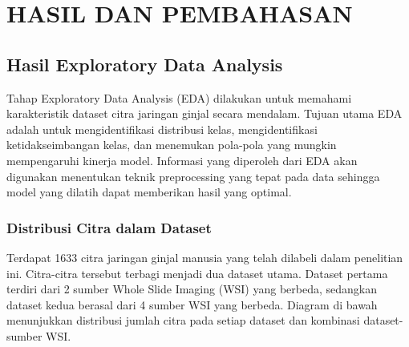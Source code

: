\chapter{HASIL DAN PEMBAHASAN}

\section{Hasil Exploratory Data Analysis}
\label{sec:hasil-eda}

\noindent Tahap Exploratory Data Analysis (EDA) dilakukan untuk memahami karakteristik dataset citra jaringan ginjal secara mendalam. Tujuan utama EDA adalah untuk mengidentifikasi distribusi kelas, mengidentifikasi ketidakseimbangan kelas, dan menemukan pola-pola yang mungkin mempengaruhi kinerja model. Informasi yang diperoleh dari EDA akan digunakan menentukan teknik preprocessing yang tepat pada data sehingga model yang dilatih dapat memberikan hasil yang optimal.

\subsection{Distribusi Citra dalam Dataset}
\noindent Terdapat 1633 citra jaringan ginjal manusia yang telah dilabeli dalam penelitian ini. Citra-citra tersebut terbagi menjadi dua dataset utama. Dataset pertama terdiri dari 2 sumber Whole Slide Imaging (WSI) yang berbeda, sedangkan dataset kedua berasal dari 4 sumber WSI yang berbeda. Diagram di bawah menunjukkan distribusi jumlah citra pada setiap dataset dan kombinasi dataset-sumber WSI.

